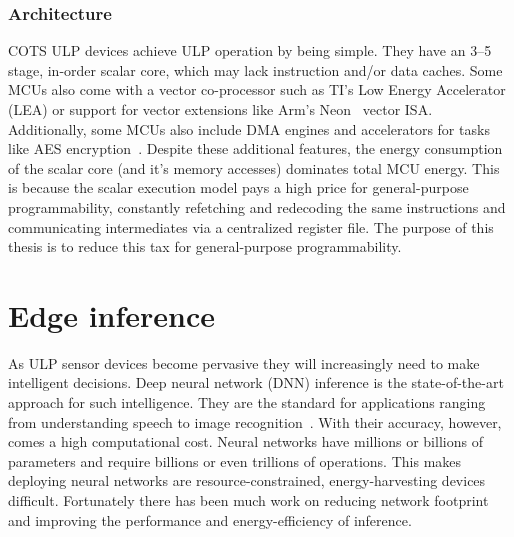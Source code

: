 \subsubsection{Architecture}
COTS ULP devices achieve ULP operation by being simple.
% 
They have an 3--5 stage, in-order scalar core, which may lack instruction and/or data caches.
% 
Some MCUs also come with a vector co-processor such as TI's Low Energy Accelerator (LEA) or support for vector extensions like Arm's Neon~\cite{neon} vector ISA.
% 
Additionally, some MCUs also include DMA engines and accelerators for tasks like AES encryption~\cite{msp430fr5994}.
% 
Despite these additional features, the energy consumption of the scalar core (and it's memory accesses) dominates total MCU energy.
% 
This is because the scalar execution model pays a high price for general-purpose programmability, constantly refetching and redecoding the same instructions and communicating intermediates via a centralized register file.
% 
The purpose of this thesis is to reduce this tax for general-purpose programmability.

\section{Edge inference}
As ULP sensor devices become pervasive they will increasingly need to make intelligent decisions.
% 
Deep neural network (DNN) inference is the state-of-the-art approach for such intelligence.
% 
They are the standard for applications ranging from understanding speech to image recognition~\cite{alexnet,vgg, googlenet}.
% 
With their accuracy, however, comes a high computational cost.
% 
Neural networks have millions or billions of parameters and require billions or even trillions of operations.
% 
This makes deploying neural networks are resource-constrained, energy-harvesting devices difficult.
% 
Fortunately there has been much work on reducing network footprint and improving the performance and energy-efficiency of inference.
% 

